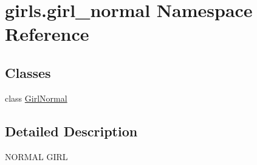 \hypertarget{namespacegirls_1_1girl__normal}{}\section{girls.\+girl\+\_\+normal Namespace Reference}
\label{namespacegirls_1_1girl__normal}
\subsection*{Classes}
\begin{DoxyCompactItemize}
\item 
class \hyperlink{classgirls_1_1girl__normal_1_1_girl_normal}{Girl\+Normal}
\end{DoxyCompactItemize}


\subsection{Detailed Description}
\begin{DoxyVerb}NORMAL GIRL\end{DoxyVerb}
 